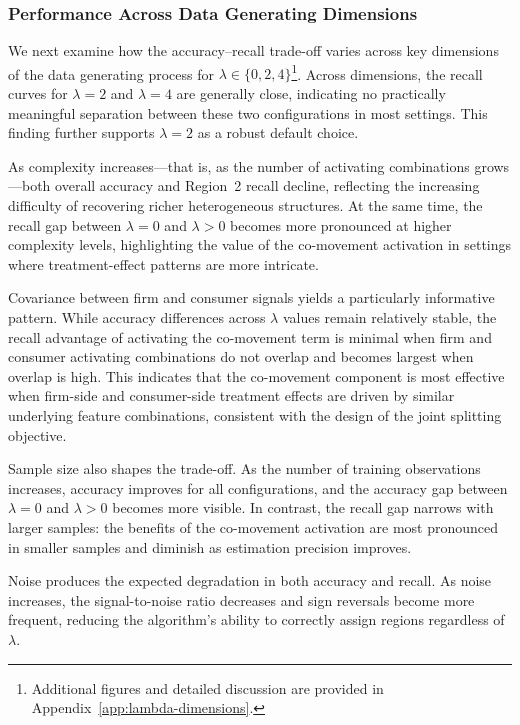 \documentclass[11pt,letterpaper,english]{article}
\theoremstyle{definition}
\theoremstyle{definition}
\begin{document}
\begin{bibunit}
\subsubsection{Performance Across Data Generating Dimensions}
\label{sec:lambda-dimensions}

We next examine how the accuracy--recall trade-off varies across key dimensions of the data generating process for $\lambda \in \{0, 2, 4\}$\footnote{Additional figures and detailed discussion are provided in Appendix~\ref{app:lambda-dimensions}.}. Across dimensions, the recall curves for $\lambda = 2$ and $\lambda = 4$ are generally close, indicating no practically meaningful separation between these two configurations in most settings. This finding further supports $\lambda = 2$ as a robust default choice.

As complexity increases—that is, as the number of activating combinations grows—both overall accuracy and Region~2 recall decline, reflecting the increasing difficulty of recovering richer heterogeneous structures. At the same time, the recall gap between $\lambda = 0$ and $\lambda > 0$ becomes more pronounced at higher complexity levels, highlighting the value of the co-movement activation in settings where treatment-effect patterns are more intricate.

Covariance between firm and consumer signals yields a particularly informative pattern. While accuracy differences across $\lambda$ values remain relatively stable, the recall advantage of activating the co-movement term is minimal when firm and consumer activating combinations do not overlap and becomes largest when overlap is high. This indicates that the co-movement component is most effective when firm-side and consumer-side treatment effects are driven by similar underlying feature combinations, consistent with the design of the joint splitting objective.

Sample size also shapes the trade-off. As the number of training observations increases, accuracy improves for all configurations, and the accuracy gap between $\lambda = 0$ and $\lambda > 0$ becomes more visible. In contrast, the recall gap narrows with larger samples: the benefits of the co-movement activation are most pronounced in smaller samples and diminish as estimation precision improves.

Noise produces the expected degradation in both accuracy and recall. As noise increases, the signal-to-noise ratio decreases and sign reversals become more frequent, reducing the algorithm’s ability to correctly assign regions regardless of $\lambda$.


\end{bibunit}
\end{document}

